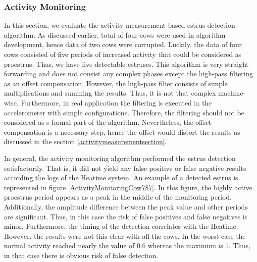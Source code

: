 \documentclass[english,12pt,a4paper,pdftex,elec,utf8]{aaltothesis}
\begin{document}
\subsubsection{Activity Monitoring} \label{activitymeasurementevaluation}

In this section, we evaluate the activity measurement based estrus detection algorithm. As discussed earlier, total of four cows were used in algorithm development, hence data of two cows were corrupted.  Luckily, the data of four cows consisted of five periods of increased activity that could be considered as proestrus. Thus, we have five detectable estruses. This algorithm is very straight forwarding and does not consist any complex phases except the high-pass filtering as an offset compensation. However, the high-pass filter consists of simple multiplications and summing the results. Thus, it is not that complex machine-wise. Furthermore, in real application the filtering is executed in the accelerometer with simple configurations. Therefore, the filtering should not be considered as s formal part of the algorithm. Nevertheless, the offset compensation is a necessary step, hence the offset would distort the results as discussed in the section \ref{activitymeasurementsection}.

In general, the activity monitoring algorithm performed the estrus detection satisfactorily. That is, it did not yield any false positive or false negative results according the logs of the Heatime system. An example of a detected estrus is represented in figure \ref{ActivityMonitoringCow787}. In this figure, the highly active proestrus period appears as a peak in the middle of the monitoring period. Additionally, the amplitude difference between the peak value and other periods are significant. Thus, in this case the risk of false positives and false negatives is minor. Furthermore, the timing of the detection correlates with the Heatime. However, the results were not this clear with all the cows. In the worst case the normal activity reached nearly the value of 0.6 whereas the maximum is 1. Thus, in that case there is obvious risk of false detection. 
\end{document}
